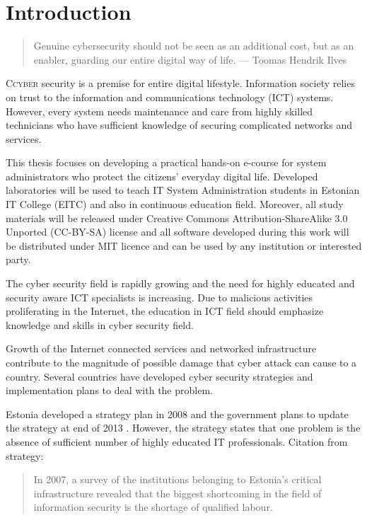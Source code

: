 \chapter{Introduction}
\label{Introduction}

 
\begin{quote}
Genuine cybersecurity should not be seen as an additional cost, but as an enabler, guarding our entire digital way of life. --- Toomas Hendrik Ilves
\end{quote}

\lettrine[lraise=0.1, nindent=0em, slope=-.5em]{\color{Violet}C}{cyber} security is a premise for entire digital lifestyle. Information society relies on trust to the information and communications technology (\gls{ICT}) systems. However, every system needs maintenance and care from highly skilled technicians who have sufficient knowledge of securing complicated networks and services. 

This thesis focuses on developing a practical hands-on e-course for system administrators who protect the citizens' everyday digital life. Developed laboratories will be used to teach IT System Administration students in Estonian IT College (\gls{EITC}) and also in continuous education field. Moreover, all study materials will be released under Creative Commons Attribution-ShareAlike 3.0 Unported  (\gls{CC-BY-SA}) license and all software developed during this work will be distributed under \gls{MIT} licence and can be used by any institution or interested party.

The cyber security field is rapidly growing and the need for highly educated and security aware \gls{ICT} specialists is increasing. Due to  malicious activities proliferating in the Internet, the education in \gls{ICT} field should emphasize knowledge and skills in cyber security field.

Growth of the Internet connected services and networked infrastructure contribute to the magnitude of possible damage that cyber attack can cause to a country. Several countries have developed cyber security strategies and implementation plans to deal with the problem.

Estonia developed a strategy plan in 2008 \citep{Strategy2008} and the government plans to update the strategy at end of 2013 \citep{StrategyProposal2013}. However, the strategy states that one problem is the absence of sufficient number of highly educated IT professionals. Citation from strategy:  
\begin{quote}
In 2007, a survey of the institutions belonging to Estonia’s critical infrastructure revealed that the biggest shortcoming in the field of information security is the shortage of qualified labour. \citep[p.~16]{Strategy2008}
\end{quote}


